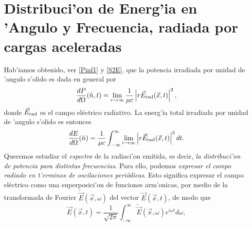 \section{Distribuci'on de Energ'ia en 'Angulo y Frecuencia, radiada
por cargas aceleradas}

Hab'iamos obtenido, ver \eqref{Pinf1} y \eqref{S2E}, que la potencia irradiada por unidad de 'angulo s'olido es dada en general por
\begin{equation}\label{dp1}
\frac{dP}{d\Omega}(\hat{n},t)=\lim_{r\to\infty}\frac{1}{\mu c}\left|r\vec{E}_{\rm{rad}}(\vec{x},t)\right|^2 , %
\end{equation}
donde $\vec{E}_{\rm{rad}}$ es el campo eléctrico radiativo.
%
La energ'ia total irradiada por unidad de 'angulo s'olido es entonces
\begin{equation}
\frac{dE}{d\Omega}(\hat{n}) =\frac{1}{\mu c}\int_{-\infty}^{\infty}\lim_{r\to\infty}\left|r\vec{E}_{\rm{rad}}(\vec{x},t)\right|^2 dt .
\end{equation}
Queremos estudiar el \textit{espectro} de la radiaci'on emitida, es decir, \textit{la distribuci'on de potencia para distintas frecuencias}. Para ello, podemos \textit{expresar el campo radiado en t'erminos de oscilaciones periódicas}. Esto significa expresar el campo eléctrico como una superposici'on de funciones arm'onicas, por medio de la transformada de Fourier $\tilde{\vec{E}}(\vec{x},\omega)$ del vector $\vec{E}(\vec{x},t)$, de modo que
\begin{equation}
 \vec{E}(\vec{x},t)=\frac{1}{\sqrt{2\pi}}\int_{-\infty}^{\infty}\tilde{\vec{E}}
(\vec{x},\omega) e^{i\omega t}d\omega ,
\end{equation}
